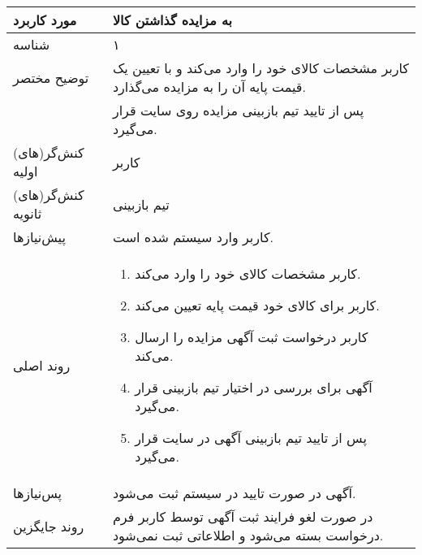 \documentclass{article}
\begin{document}
\begin{center}
\bgroup
\def\arraystretch{1.5}
\begin{tabular} {|p{}|p{}|}
\hline
 مورد کاربرد & 
 به مزایده گذاشتن کالا
\\ \hline
 شناسه &
۱
\\ \hline
توضیح مختصر &
کاربر مشخصات کالای خود را وارد می‌کند و با تعیین یک قیمت پایه آن را به مزایده می‌گذارد.
\\
&
پس از تایید تیم بازبینی مزایده روی سایت قرار می‌گیرد.
\\ \hline
کنش‌گر(های) اولیه &
کاربر
\\ \hline
کنش‌گر(های) ثانویه &
تیم بازبینی
\\ \hline
پیش‌نیازها &
کاربر وارد سیستم شده است.
\\ \hline
روند اصلی &
\begin{enumerate}
\item
کاربر مشخصات کالای خود را وارد می‌کند.
\item
کاربر برای کالای خود قیمت پایه تعیین می‌کند.
\item
کاربر درخواست ثبت آگهی مزایده را ارسال می‌کند.
\item
آگهی برای بررسی در اختیار تیم بازبینی قرار می‌گیرد.
\item
پس از تایید تیم بازبینی آگهی در سایت قرار می‌گیرد.
\end{enumerate}
\\ \hline
پس‌نیازها &
آگهی در صورت تایید در سیستم ثبت می‌شود.
\\ \hline
روند جایگزین &
در صورت لغو فرایند ثبت آگهی توسط کاربر فرم درخواست بسته می‌شود و اطلاعاتی ثبت نمی‌شود.
\\ \hline
\end{tabular}
\egroup
\end{center}

\newpage
\end{document}
